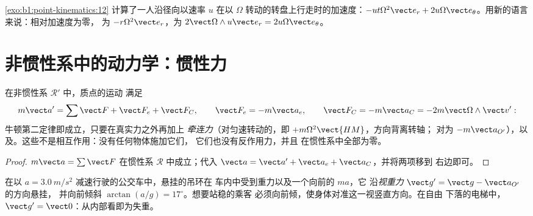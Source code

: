 \begin{example}[在转盘上行走]\label{ex:b1:non-inertial-frames:turntable}
\cref{exo:b1:point-kinematics:12} 计算了一人沿径向以速率 $u$
在以 $\Omega$ 转动的转盘上行走时的加速度：$-ut\Omega^2\vect e_r
+ 2u\Omega\vect e_\theta$。用新的语言来说：相对加速度为零，
为 $-r\Omega^2\vect e_r$，为 $2\vect\Omega\wedge u\vect e_r = 2u\Omega\vect e_\theta$。
\end{example}

\section{非惯性系中的动力学：惯性力}

\begin{theorem}[非惯性系中的牛顿定律]\label{thm:b1:non-inertial-frames:dynamics}
在非惯性系 $\mathcal R'$ 中，质点的运动
满足
\[
m\vect a' = \sum\vect F + \vect F_e + \vect F_C, \qquad
\vect F_e = -m\vect a_e, \qquad \vect F_C = -m\vect a_C = -2m\vect\Omega\wedge\vect v' :
\]
牛顿第二定律即成立，只要在真实力之外再加上
\emph{牵连力}（对匀速转动的，即
\emph{} $+m\Omega^2\vect{HM}$，方向背离转轴；
对为 $-m\vect a_{O'}$），以及\emph{}。这些\emph{}不是相互作用：没有任何物体施加它们，
它们也没有反作用力，并且
在惯性系中全部为零。
\end{theorem}

\begin{proof}
$m\vect a = \sum\vect F$ 在惯性系 $\mathcal R$ 中成立；代入
$\vect a = \vect a' + \vect a_e + \vect a_C$，并将两项移到
右边即可。
\end{proof}

\begin{example}[乘车的乘客与铅锤]\label{ex:b1:non-inertial-frames:bus}
在以 $a = \qty{3.0}{m/s^2}$ 减速行驶的公交车中，悬挂的吊环在
车内中受到重力以及一个向前的 $ma$，它
沿\emph{视重力} $\vect g' = \vect g - \vect a_{O'}$ 的方向悬挂，
并向前倾斜 $\arctan(a/g) = 17^\circ$。想要站稳的乘客
必须向前倾，使身体对准这一视竖直方向。在自由
下落的电梯中，$\vect g' = \vect 0$：从内部看即为失重。
\end{example}


